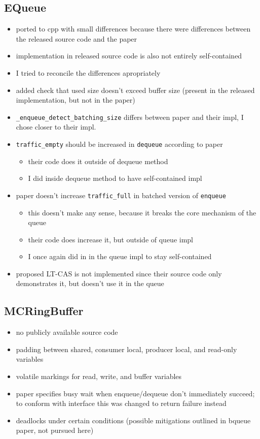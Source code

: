 \subsection{EQueue}
\begin{itemize}
    \item ported to cpp with small differences because there were differences between the released source
        code and the paper
    \item implementation in released source code is also not entirely self-contained
    \item I tried to reconcile the differences apropriately
    \item added check that used size doesn't exceed buffer size (present in the released implementation, but
        not in the paper)
    \item \texttt{\_enqueue\_detect\_batching\_size} differs between paper and their impl, I chose closer to their impl.
    \item \texttt{traffic\_empty} should be increased in \texttt{dequeue} according to paper
        \begin{itemize}
            \item their code does it outside of dequeue method
            \item I did inside dequeue method to have self-contained impl
        \end{itemize}
    \item paper doesn't increase \texttt{traffic\_full} in batched version of \texttt{enqueue}
        \begin{itemize}
            \item this doesn't make any sense, because it breaks the core mechanism of the queue
            \item their code does increase it, but outside of queue impl
            \item I once again did in in the queue impl to stay self-contained
        \end{itemize}
    \item proposed LT-CAS is not implemented since their source code only demonstrates it, but doesn't use it
        in the queue
\end{itemize}

\subsection{MCRingBuffer}
\begin{itemize}
    \item no publicly available source code
    \item padding between shared, consumer local, producer local, and read-only variables
    \item volatile markings for read, write, and buffer variables
    \item paper specifies busy wait when enqueue/dequeue don't immediately succeed; to conform with interface
        this was changed to return failure instead
    \item deadlocks under certain conditions (possible mitigations outlined in bqueue paper, not pursued here)
\end{itemize}

